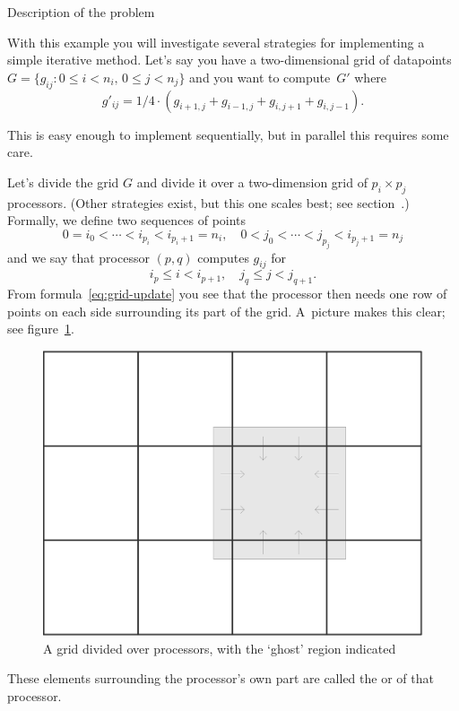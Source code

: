  {Description of the problem}

With this example you will investigate several strategies for
implementing a simple iterative method. Let's say you have a
two-dimensional grid of datapoints $G=\{g_{ij}\colon 0\leq
i<n_i,\,0\leq j<n_j\}$ and you want to compute~$G'$ where
\begin{equation}
g'_{ij} = 1/4 \cdot (g_{i+1,j}+g_{i-1,j}+g_{i,j+1}+g_{i,j-1}).
\label{eq:grid-update}
\end{equation}

This is easy enough to implement sequentially, but in parallel this
requires some care.

Let's divide the grid $G$ and divide it over a two-dimension grid of
$p_i\times p_j$
processors. (Other strategies exist, but this one scales best; see
section~.)
Formally, we define two sequences of points
\[ 0=i_0<\cdots<i_{p_i}<i_{p_i+1}=n_i,\quad 
   0<j_0<\cdots<j_{p_j}<i_{p_j+1}=n_j
\]
and we say that processor $(p,q)$ computes $g_{ij}$ for
\[ i_p\leq i<i_{p+1}, \quad j_q\leq j<j_{q+1}.
\]
From formula~\eqref{eq:grid-update} you see that the processor then
needs one row of points on each side surrounding its part of the
grid. A~picture makes this clear; see figure~\ref{fig:ghost-grid}.
\begin{figure}
\includegraphics[scale=.1]{graphics/jacobi-average}
\caption{A grid divided over processors, with the `ghost' region indicated}
\label{fig:ghost-grid}
\end{figure}
These elements surrounding the processor's own part are called
the  or  of that processor.


